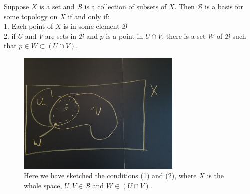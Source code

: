 \documentclass[a4paper,12pt,twoside]{hmcpset}
\begin{document}
\begin{problem}[Theorem 4.3] Suppose $X$ is a set and $\mathscr{B}$ is
    a collection of subsets of $X$. Then $\mathscr{B}$ is a basis for
    some topology on $X$ if and only if:\\
    1. Each point of $X$ is in some element $\mathscr{B}$\\
    2. if $U$ and $V$ are sets in $\mathscr{B}$ and $p$ is a point in
    $U \cap V$, there is a set $W$ of $\mathscr{B}$ such that $p \in W
    \subset (U \cap V)$.
\end{problem}
    
\begin{figure}[h]
    \centering
    \includegraphics[width=0.7\textwidth]{sketch_theorem_4_3.jpg}
    \caption{Here we have sketched the conditions (1) and (2), where
    $X$ is the whole space, $U, V \in \mathscr{B}$ and $W \in (U \cap
    V)$.}
\end{figure}
\end{document}
